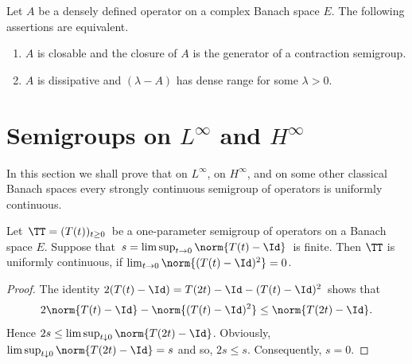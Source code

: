 \begin{theorem}\label{thm:a2-2.13}
Let $A$ be a densely defined operator on a complex Banach space $E$.
The following assertions are equivalent.
\begin{enumerate}[\upshape (a)]	
\item \label{thm:a2-2.13.1}
$A$ is closable and the closure of\/ $A$ is the generator of a contraction semigroup.
\item \label{thm:a2-2.13.2}
$A$ is dissipative and $(\lambda - A)$ has dense range for some $\lambda > 0$.
\end{enumerate}
\end{theorem}
\section{Semigroups on \texorpdfstring{$L^{\infty}$}{L-infty}  and \texorpdfstring{$H^{\infty}$}{H-infty} \label{sec:a2-3}}%
\hspace{1cm}{\Large by Heinrich P. Lotz}
\vspace{.5cm}
\newline
In this section we shall prove that on $L^\infty$, on $H^\infty$, and on some other classical Banach spaces every strongly continuous semigroup of operators is uniformly continuous.
\begin{lemma}\label{lem:a2-3.1}
Let\, $\TT = (T(t))_{t\geq 0}$\, be a one-parameter semigroup of operators on a Banach space $E$.
Suppose that\, $s = \lim\sup_{t\to 0} \norm{T(t) - \Id}$\, is finite.
Then $\TT$ is uniformly continuous, if\/ $\lim_{t\to 0} \norm{(T(t) - \Id)^2} = 0$.
\end{lemma}
\begin{proof}
The identity  $2(T(t) - \Id) = T(2t) - \Id - (T(t) - \Id)^2$\, shows that
\[
	2\norm{T(t) - \Id} - \norm{(T(t) - \Id)^{2} } \leq \norm{T(2t) - \Id} .
\]
Hence $2s \leq \lim \sup_{t \downarrow 0} \norm{T(2t) - \Id}$.
Obviously, $\lim \sup_{t \downarrow 0} \norm{T(2t) - \Id} = s$ and so, $2s \leq s$.
Consequently, $s = 0$.
\end{proof}
